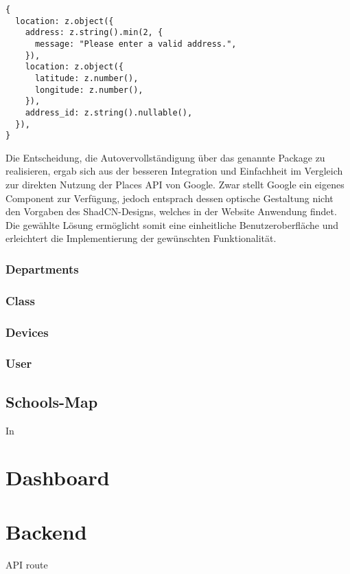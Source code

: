 \begin{inhalt}
\begin{lstlisting}[style=myjson]
{
  location: z.object({
    address: z.string().min(2, {
      message: "Please enter a valid address.",
    }),
    location: z.object({
      latitude: z.number(),
      longitude: z.number(),
    }),
    address_id: z.string().nullable(),
  }),
}
\end{lstlisting}

Die Entscheidung, die Autovervollständigung über das genannte Package zu realisieren, ergab sich aus der besseren Integration und Einfachheit im Vergleich zur direkten Nutzung der Places API von Google. Zwar stellt Google ein eigenes Component zur Verfügung, jedoch entsprach dessen optische Gestaltung nicht den Vorgaben des ShadCN-Designs, welches in der Website Anwendung findet. Die gewählte Lösung ermöglicht somit eine einheitliche Benutzeroberfläche und erleichtert die Implementierung der gewünschten Funktionalität.


\subsubsection{Departments}

\subsubsection{Class}

\subsubsection{Devices}

\subsubsection{User}

\subsection{Schools-Map}


In


\section{Dashboard}

\section{Backend}



API route






\end{inhalt}